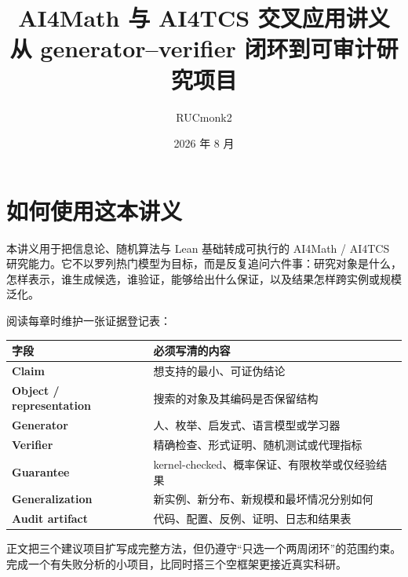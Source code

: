\documentclass[UTF8,zihao=-4,oneside,fontset=fandol]{ctexrep}
\title{\heiti AI4Math 与 AI4TCS 交叉应用讲义\\[0.5em]
\Large 从 generator--verifier 闭环到可审计研究项目}
\author{RUCmonk2}
\date{2026 年 8 月}
\theoremstyle{remark}
\begin{document}
\hypersetup{pageanchor=false}
\maketitle
\hypersetup{pageanchor=true}

\chapter*{如何使用这本讲义}

本讲义用于把信息论、随机算法与 Lean 基础转成可执行的 AI4Math / AI4TCS 研究能力。它不以罗列热门模型为目标，而是反复追问六件事：研究对象是什么，怎样表示，谁生成候选，谁验证，能够给出什么保证，以及结果怎样跨实例或规模泛化。

阅读每章时维护一张证据登记表：
\begin{center}
\begin{tabularx}{0.94\textwidth}{>{\bfseries}lX}
\toprule
字段 & 必须写清的内容 \\
\midrule
Claim & 想支持的最小、可证伪结论 \\
Object / representation & 搜索的对象及其编码是否保留结构 \\
Generator & 人、枚举、启发式、语言模型或学习器 \\
Verifier & 精确检查、形式证明、随机测试或代理指标 \\
Guarantee & kernel-checked、概率保证、有限枚举或仅经验结果 \\
Generalization & 新实例、新分布、新规模和最坏情况分别如何 \\
Audit artifact & 代码、配置、反例、证明、日志和结果表 \\
\bottomrule
\end{tabularx}
\end{center}

正文把三个建议项目扩写成完整方法，但仍遵守“只选一个两周闭环”的范围约束。完成一个有失败分析的小项目，比同时搭三个空框架更接近真实科研。

\tableofcontents
\clearpage









\end{document}
